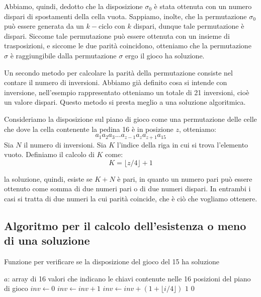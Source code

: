 Abbiamo, quindi, dedotto che la disposizione $\sigma_0$ è stata ottenuta con un numero dispari di spostamenti della cella vuota.
Sappiamo, inolte, che la permutazione $\sigma_0$ può essere generata da un $k-$ciclo con $k$ dispari, dunque tale permutazione è dispari. 
Siccome tale permutazione può essere ottenuta con un insieme di trasposizioni, e siccome le due parità coincidono, otteniamo che la permutazione $\sigma$ è raggiungibile dalla permutazione $\sigma$ ergo il gioco ha soluzione. 

Un secondo metodo per calcolare la parità della permutazione consiste nel contare il numero di inversioni. 
Abbiamo già definito cosa si intende con inversione, nell'esempio rappresentato otteniamo un totale di 21 inversioni, cioè un valore dispari.
Questo metodo si presta meglio a una soluzione algoritmica. 

Consideriamo la disposizione sul piano di gioco come una permutazione delle celle che dove la cella contenente la pedina 16 è in posizione $z$, otteniamo: 
$$
a_1a_2a_3...a_{z-1}a_{z}a_{z+1}a_{15}
$$
Sia $N$ il numero di inversioni.
Sia $K$ l'indice della riga in cui si trova l'elemento vuoto. Definiamo il calcolo di $K$ come:
$$
K = \lfloor z/4 \rfloor + 1
$$

la soluzione, quindi, esiste se $K+N$ è pari, in quanto un numero pari può essere ottenuto come somma di due numeri pari o di due numeri dispari. In entrambi i casi si tratta di due numeri la cui parità coincide, che è ciò che vogliamo ottenere. 

\subsection{Algoritmo per il calcolo dell'esistenza o meno di una soluzione ~\cite{7}}

\begin{algorithm}[H]
\caption{Funzione per verificare se la disposizione del gioco del 15 ha soluzione}
\small  %
\begin{algorithmic}[1]
\Require $a$: array di 16 valori che indicano le chiavi contenute nelle 16 posizioni del piano di gioco
    \State $inv \gets 0$
                    \State $inv \gets inv + 1$
                \EndIf
            \EndFor
        \EndIf
    \EndFor
            \State $inv \gets inv + (1 + \lfloor i/4 \rfloor)$
        \EndIf
    \EndFor
        \State \Return $1$
    \Else
        \State \Return $0$
    \EndIf
\EndFunction
\end{algorithmic}
\end{algorithm}

